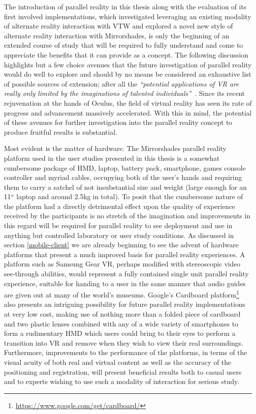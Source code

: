 The introduction of parallel reality in this thesis along with the evaluation of its first involved implementations, which investigated leveraging an existing modality of alternate reality interaction with VTW and explored a novel new style of alternate reality interaction with Mirrorshades, is only the beginning of an extended course of study that will be required to fully understand and come to appreciate the benefits that it can provide as a concept. The following discussion highlights but a few choice avenues that the future investigation of parallel reality would do well to explore and should by no means be considered an exhaustive list of possible sources of extension; after all the \textit{``potential applications of VR are really only limited by the imaginations of talented individuals''}~\cite{Giuseppe2014a}. Since its recent rejuvenation at the hands of Oculus, the field of virtual reality has seen its rate of progress and advancement massively accelerated. With this in mind, the potential of these avenues for further investigation into the parallel reality concept to produce fruitful results is substantial.

Most evident is the matter of hardware. The Mirrorshades parallel reality platform used in the user studies presented in this thesis is a somewhat cumbersome package of HMD, laptop, battery pack, smartphone, games console controller and myriad cables, occupying both of the user's hands and requiring them to carry a satchel of not insubstantial size and weight (large enough for an 11`` laptop and around 2.5kg in total). To posit that the cumbersome nature of the platform had a directly detrimental effect upon the quality of experience received by the participants is no stretch of the imagination and improvements in this regard will be required for parallel reality to see deployment and use in anything but controlled laboratory or user study conditions. As discussed in section \ref{mobile-client} we are already beginning to see the advent of hardware platforms that present a much improved basis for parallel reality experiences. A platform such as Samsung Gear VR, perhaps modified with stereoscopic video see-through abilities, would represent a fully contained single unit parallel reality experience, suitable for handing to a user in the same manner that audio guides are given out at many of the world's museums. Google's Cardboard platform\footnote{\url{https://www.google.com/get/cardboard/}} also presents an intriguing possibility for future parallel reality implementations at very low cost, making use of nothing more than a folded piece of cardboard and two plastic lenses combined with any of a wide variety of smartphones to form a rudimentary HMD which users could bring to their eyes to perform a transition into VR and remove when they wish to view their real surroundings. Furthermore, improvements to the performance of the platforms, in terms of the visual acuity of both real and virtual content as well as the accuracy of the positioning and registration, will present beneficial results both to casual users and to experts wishing to use such a modality of interaction for serious study. 

